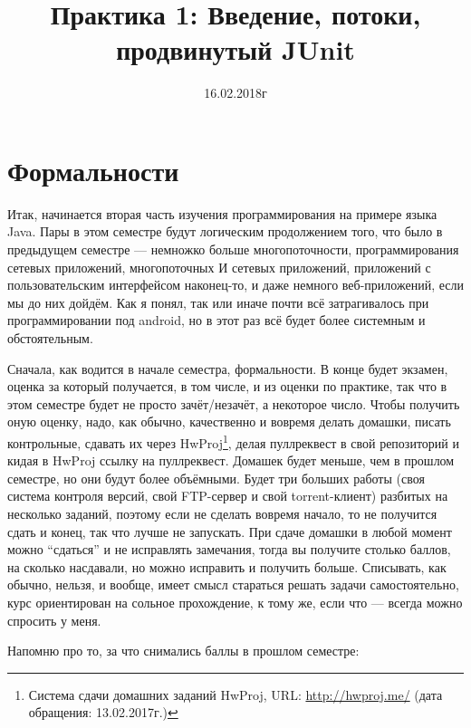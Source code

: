 \documentclass[a5paper]{article}
\title{Практика 1: Введение, потоки, продвинутый JUnit}
\date{16.02.2018г}
\begin{document}
\maketitle
\thispagestyle{empty}

\section{Формальности}
Итак, начинается вторая часть изучения программирования на примере языка Java. Пары в этом семестре будут логическим продолжением того, что было в предыдущем семестре --- немножко больше многопоточности, программирования сетевых приложений, многопоточных И сетевых приложений, приложений с пользовательским интерфейсом наконец-то, и даже немного веб-приложений, если мы до них дойдём. Как я понял, так или иначе почти всё затрагивалось при программировании под android, но в этот раз всё будет более системным и обстоятельным.

Сначала, как водится в начале семестра, формальности. В конце будет экзамен, оценка за который получается, в том числе, и из оценки по практике, так что в этом семестре будет не просто зачёт/незачёт, а некоторое число. Чтобы получить оную оценку, надо, как обычно, качественно и вовремя делать домашки, писать контрольные, сдавать их через HwProj\footnote{Система сдачи домашних заданий HwProj, URL: \url{http://hwproj.me/} (дата обращения: 13.02.2017г.)}, делая пуллреквест в свой репозиторий и кидая в HwProj ссылку на пуллреквест. Домашек будет меньше, чем в прошлом семестре, но они будут более объёмными. Будет три больших работы (своя система контроля версий, свой FTP-сервер и свой torrent-клиент) разбитых на несколько заданий, поэтому если не сделать вовремя начало, то не получится сдать и конец, так что лучше не запускать. При сдаче домашки в любой момент можно ``сдаться'' и не исправлять замечания, тогда вы получите столько баллов, на сколько насдавали, но можно исправить и получить больше. Списывать, как обычно, нельзя, и вообще, имеет смысл стараться решать задачи самостоятельно, курс ориентирован на сольное прохождение, к тому же, если что --- всегда можно спросить у меня.

Напомню про то, за что снимались баллы в прошлом семестре:\nopagebreak
\end{document}
